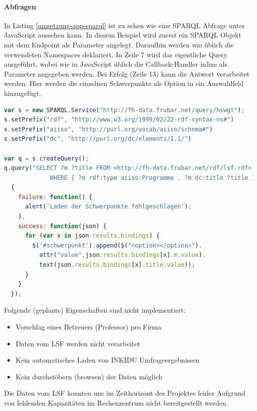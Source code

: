 \paragraph{Abfragen}
In Listing \ref{umsetzung-app-sparql} ist zu sehen wie eine SPARQL Abfrage unter JavaScript aussehen kann.
In diesem Beispiel wird zuerst ein SPARQL Objekt mit dem Endpoint als Parameter angelegt.
Daraufhin werden wie üblich die verwendeten Namespaces deklariert.
In Zeile 7 wird das eigentliche Query ausgeführt, wobei wie in JavaScript üblich die Callback-Handler inline als Parameter angegeben werden.
Bei Erfolg (Zeile 13) kann die Antwort verarbeitet werden. Hier werden die einzelnen Schwerpunkte als Option in ein Auswahlfeld hinzugefügt.

\begin{lstlisting}[language=JavaScript,caption=SPARQL Abfrage mit JavaScript,stepnumber=1,label=umsetzung-app-sparql]
var s = new SPARQL.Service("http://fh-data.frubar.net/query/hswgt");
s.setPrefix("rdf", "http://www.w3.org/1999/02/22-rdf-syntax-ns#")
s.setPrefix("aiiso", "http://purl.org/vocab/aiiso/schema#")
s.setPrefix("dc", "http://purl.org/dc/elements/1.1/")

var q = s.createQuery();
q.query("SELECT ?m ?title FROM <http://fh-data.frubar.net/rdf/lsf.rdf> \
             WHERE { ?m rdf:type aiiso:Programme . ?m dc:title ?title }",
  {
    failure: function() {
      alert('Laden der Schwerpunkte fehlgeschlagen');
    },
    success: function(json) {
      for (var x in json.results.bindings) {
        $('#schwerpunkt').append($("<option></option>").
          attr("value",json.results.bindings[x].m.value).
          text(json.results.bindings[x].title.value));
      }
    }
  });
\end{lstlisting}

Folgende (geplante) Eigenschaften sind nicht implementiert:
\begin{itemize}
 \item Vorschlag eines Betreuers (Professor) pro Firma
 \item Daten vom LSF werden nicht verarbeitet
 \item Kein automatisches Laden von INKIDU Umfrageergebnissen
 \item Kein durchstöbern (browsen) der Daten möglich
\end{itemize}
Die Daten vom LSF konnten uns im Zeithorizont des Projektes leider Aufgrund von fehlenden Kapazitäten im Rechenzentrum nicht bereitgestellt werden.

